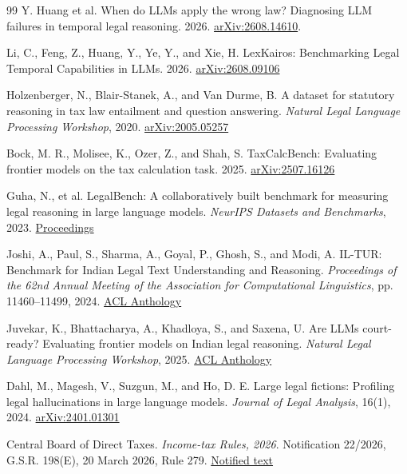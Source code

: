 \documentclass[10pt,letterpaper,twocolumn]{article}
\begin{document}
\begin{thebibliography}{99}
Y. Huang et al.
When do LLMs apply the wrong law? Diagnosing LLM failures in temporal legal reasoning. 2026.
\href{https://arxiv.org/abs/2608.14610}{arXiv:2608.14610}.

Li, C., Feng, Z., Huang, Y., Ye, Y., and Xie, H. LexKairos: Benchmarking Legal Temporal Capabilities in LLMs. 2026. \href{https://arxiv.org/abs/2608.09106}{arXiv:2608.09106}

Holzenberger, N., Blair-Stanek, A., and Van Durme, B. A dataset for statutory reasoning in tax law entailment and question answering. \textit{Natural Legal Language Processing Workshop}, 2020. \href{https://arxiv.org/abs/2005.05257}{arXiv:2005.05257}

Bock, M. R., Molisee, K., Ozer, Z., and Shah, S. TaxCalcBench: Evaluating frontier models on the tax calculation task. 2025. \href{https://arxiv.org/abs/2507.16126}{arXiv:2507.16126}

Guha, N., et al. LegalBench: A collaboratively built benchmark for measuring legal reasoning in large language models. \textit{NeurIPS Datasets and Benchmarks}, 2023. \href{https://proceedings.neurips.cc/paper\_files/paper/2023/hash/89e44582fd28ddfea1ea4dcb0ebbf4b0-Abstract-Datasets\_and\_Benchmarks.html}{Proceedings}

Joshi, A., Paul, S., Sharma, A., Goyal, P., Ghosh, S., and Modi, A. IL-TUR: Benchmark for Indian Legal Text Understanding and Reasoning. \textit{Proceedings of the 62nd Annual Meeting of the Association for Computational Linguistics}, pp. 11460--11499, 2024. \href{https://aclanthology.org/2024.acl-long.618/}{ACL Anthology}

Juvekar, K., Bhattacharya, A., Khadloya, S., and Saxena, U. Are LLMs court-ready? Evaluating frontier models on Indian legal reasoning. \textit{Natural Legal Language Processing Workshop}, 2025. \href{https://aclanthology.org/2025.nllp-1.26/}{ACL Anthology}

Dahl, M., Magesh, V., Suzgun, M., and Ho, D. E. Large legal fictions: Profiling legal hallucinations in large language models. \textit{Journal of Legal Analysis}, 16(1), 2024. \href{https://arxiv.org/abs/2401.01301}{arXiv:2401.01301}

Central Board of Direct Taxes. \textit{Income-tax Rules, 2026}. Notification 22/2026, G.S.R. 198(E), 20 March 2026, Rule 279. \href{https://www.incometaxindia.gov.in/documents/d/guest/en-notified-it-rules-2026-20-03-2026-pdf}{Notified text}


\end{thebibliography}
\end{document}
